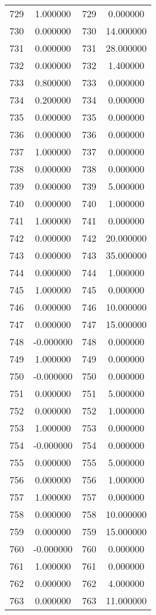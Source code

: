 \documentclass[12pt]{article}
\begin{document}
\begin{longtable}{@{}cccc@{}}
729 & 1.000000 & 729 & 0.000000 \\
730 & 0.000000 & 730 & 14.000000 \\
731 & 0.000000 & 731 & 28.000000 \\
732 & 0.000000 & 732 & 1.400000 \\
733 & 0.800000 & 733 & 0.000000 \\
734 & 0.200000 & 734 & 0.000000 \\
735 & 0.000000 & 735 & 0.000000 \\
736 & 0.000000 & 736 & 0.000000 \\
737 & 1.000000 & 737 & 0.000000 \\
738 & 0.000000 & 738 & 0.000000 \\
739 & 0.000000 & 739 & 5.000000 \\
740 & 0.000000 & 740 & 1.000000 \\
741 & 1.000000 & 741 & 0.000000 \\
742 & 0.000000 & 742 & 20.000000 \\
743 & 0.000000 & 743 & 35.000000 \\
744 & 0.000000 & 744 & 1.000000 \\
745 & 1.000000 & 745 & 0.000000 \\
746 & 0.000000 & 746 & 10.000000 \\
747 & 0.000000 & 747 & 15.000000 \\
748 & -0.000000 & 748 & 0.000000 \\
749 & 1.000000 & 749 & 0.000000 \\
750 & -0.000000 & 750 & 0.000000 \\
751 & 0.000000 & 751 & 5.000000 \\
752 & 0.000000 & 752 & 1.000000 \\
753 & 1.000000 & 753 & 0.000000 \\
754 & -0.000000 & 754 & 0.000000 \\
755 & 0.000000 & 755 & 5.000000 \\
756 & 0.000000 & 756 & 1.000000 \\
757 & 1.000000 & 757 & 0.000000 \\
758 & 0.000000 & 758 & 10.000000 \\
759 & 0.000000 & 759 & 15.000000 \\
760 & -0.000000 & 760 & 0.000000 \\
761 & 1.000000 & 761 & 0.000000 \\
762 & 0.000000 & 762 & 4.000000 \\
763 & 0.000000 & 763 & 11.000000 \\

\end{longtable}
\end{document}

